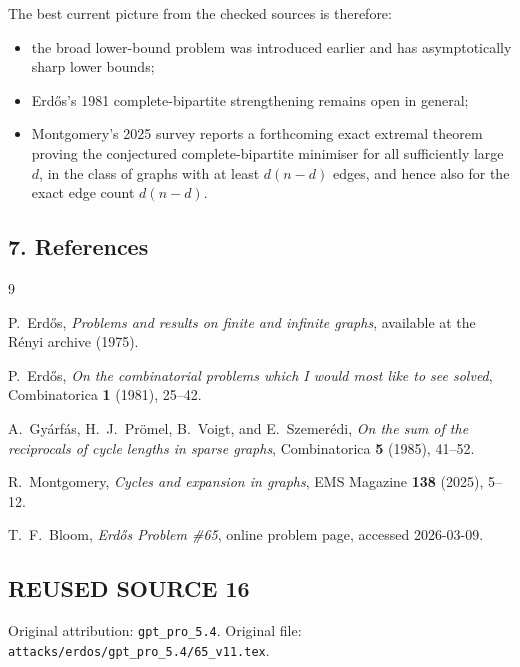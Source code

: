 The best current picture from the checked sources is therefore:
\begin{itemize}
\item the broad lower-bound problem was introduced earlier and has asymptotically sharp lower bounds;
\item Erd\H{o}s's 1981 complete-bipartite strengthening remains open in general;
\item Montgomery's 2025 survey reports a forthcoming exact extremal theorem proving the conjectured complete-bipartite minimiser for all sufficiently large $d$, in the class of graphs with at least $d(n-d)$ edges, and hence also for the exact edge count $d(n-d)$.
\end{itemize}

\subsection*{7. References}

\begin{thebibliography}{9}

P.~Erd\H{o}s,
\emph{Problems and results on finite and infinite graphs},
available at the R\'enyi archive (1975).

P.~Erd\H{o}s,
\emph{On the combinatorial problems which I would most like to see solved},
Combinatorica \textbf{1} (1981), 25--42.

A.~Gy\'arf\'as, H.~J.~Pr\"omel, B.~Voigt, and E.~Szemer\'edi,
\emph{On the sum of the reciprocals of cycle lengths in sparse graphs},
Combinatorica \textbf{5} (1985), 41--52.

R.~Montgomery,
\emph{Cycles and expansion in graphs},
EMS Magazine \textbf{138} (2025), 5--12.

T.~F.~Bloom,
\emph{Erd\H{o}s Problem \#65}, online problem page, accessed 2026-03-09.

\end{thebibliography}


\subsection*{REUSED SOURCE 16}
Original attribution: \texttt{gpt\_pro\_5.4}.
Original file: \texttt{attacks/erdos/gpt\_pro\_5.4/65\_v11.tex}.

